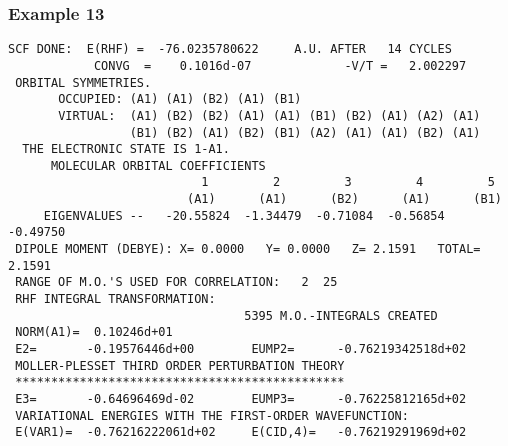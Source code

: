 \subsubsection{\sf Example 13}
{\small
\begin{verbatim}
SCF DONE:  E(RHF) =  -76.0235780622     A.U. AFTER   14 CYCLES
            CONVG  =    0.1016d-07             -V/T =   2.002297
 ORBITAL SYMMETRIES.
       OCCUPIED: (A1) (A1) (B2) (A1) (B1)
       VIRTUAL:  (A1) (B2) (B2) (A1) (A1) (B1) (B2) (A1) (A2) (A1)
                 (B1) (B2) (A1) (B2) (B1) (A2) (A1) (A1) (B2) (A1)
  THE ELECTRONIC STATE IS 1-A1.
      MOLECULAR ORBITAL COEFFICIENTS
                           1         2         3         4         5
                         (A1)      (A1)      (B2)      (A1)      (B1)
     EIGENVALUES --   -20.55824  -1.34479  -0.71084  -0.56854  -0.49750
 DIPOLE MOMENT (DEBYE): X= 0.0000   Y= 0.0000   Z= 2.1591   TOTAL= 2.1591
 RANGE OF M.O.'S USED FOR CORRELATION:   2  25
 RHF INTEGRAL TRANSFORMATION:
                                 5395 M.O.-INTEGRALS CREATED
 NORM(A1)=  0.10246d+01
 E2=       -0.19576446d+00        EUMP2=      -0.76219342518d+02
 MOLLER-PLESSET THIRD ORDER PERTURBATION THEORY
 **********************************************
 E3=       -0.64696469d-02        EUMP3=      -0.76225812165d+02
 VARIATIONAL ENERGIES WITH THE FIRST-ORDER WAVEFUNCTION:
 E(VAR1)=  -0.76216222061d+02     E(CID,4)=   -0.76219291969d+02
\end{verbatim}
}
\newpage
